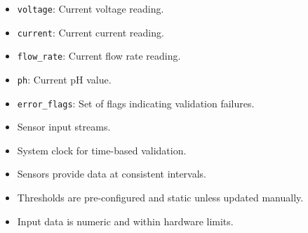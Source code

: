 \documentclass[12pt, titlepage]{article}
\begin{document}
\begin{description}
\begin{description}
  \item[State Variables:]
  \item
    \begin{itemize}
      \item \texttt{voltage}: Current voltage reading.
    \end{itemize}
    \item
    \begin{itemize}
      \item \texttt{current}: Current current reading.
    \end{itemize}
    \item 
    \begin{itemize}
      \item \texttt{flow\_rate}: Current flow rate reading.
    \end{itemize}
    \item 
    \begin{itemize}
      \item \texttt{ph}: Current pH value.
    \end{itemize}
    \item 
    \begin{itemize}
      \item \texttt{error\_flags}: Set of flags indicating validation failures.
    \end{itemize}

  \item[Environment Variables:]
  \item
    \begin{itemize}
      \item Sensor input streams.
    \end{itemize}
    \item
    \begin{itemize}
      \item System clock for time-based validation.
    \end{itemize}

  \item[Assumptions:]
  \item
    \begin{itemize}
      \item Sensors provide data at consistent intervals.
    \end{itemize}
    \item
    \begin{itemize}
      \item Thresholds are pre-configured and static unless updated manually.
    \end{itemize}
    \item 
    \begin{itemize}
      \item Input data is numeric and within hardware limits.
    \end{itemize}


\end{description}
\end{description}
\end{document}
